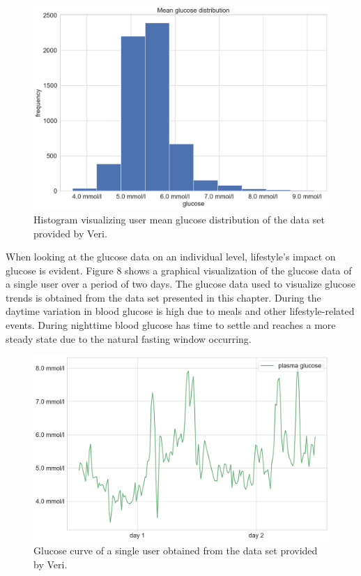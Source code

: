 \documentclass[english, 12pt, a4paper, elec, utf8, a-1b, online]{aaltothesis}
\begin{document}
\begin{figure}[H]
\centering
\includegraphics[width=14cm]{glucose_means.png}
\caption{Histogram visualizing user mean glucose distribution of the data set provided by Veri.}
\end{figure}

When looking at the glucose data on an individual level, lifestyle's impact on glucose is evident. Figure 8 shows a graphical visualization
of the glucose data of a single user over a period of two days. The glucose data used to visualize glucose trends is obtained from the data set presented in this chapter. During the daytime variation in blood glucose is high due to meals and other lifestyle-related events\cite{yamaoka_effects_2012}. During nighttime blood glucose has time to settle and reaches a more steady state due to the natural fasting window occurring\cite{sato_acute_2011}.

\begin{figure}[H]
\centering
\includegraphics[width=14cm]{user_glucose.png}
\caption{Glucose curve of a single user obtained from the data set provided by Veri.}
\end{figure}
\end{document}
